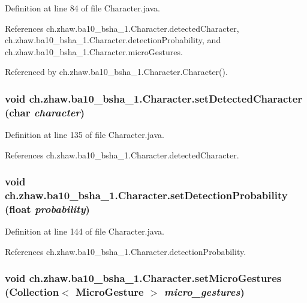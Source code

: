 Definition at line 84 of file Character.java.

References ch.zhaw.ba10\_\-bsha\_\-1.Character.detectedCharacter, ch.zhaw.ba10\_\-bsha\_\-1.Character.detectionProbability, and ch.zhaw.ba10\_\-bsha\_\-1.Character.microGestures.

Referenced by ch.zhaw.ba10\_\-bsha\_\-1.Character.Character().\hypertarget{classch_1_1zhaw_1_1ba10__bsha__1_1_1Character_aa9e5aa7c1059cddf5ff9ff451a36b74e}{
\subsubsection[{setDetectedCharacter}]{\setlength{\rightskip}{0pt plus 5cm}void ch.zhaw.ba10\_\-bsha\_\-1.Character.setDetectedCharacter (char {\em character})}}
\label{classch_1_1zhaw_1_1ba10__bsha__1_1_1Character_aa9e5aa7c1059cddf5ff9ff451a36b74e}


Definition at line 135 of file Character.java.

References ch.zhaw.ba10\_\-bsha\_\-1.Character.detectedCharacter.\hypertarget{classch_1_1zhaw_1_1ba10__bsha__1_1_1Character_a31e123df91176847469ae4ac0fab3066}{
\subsubsection[{setDetectionProbability}]{\setlength{\rightskip}{0pt plus 5cm}void ch.zhaw.ba10\_\-bsha\_\-1.Character.setDetectionProbability (float {\em probability})}}
\label{classch_1_1zhaw_1_1ba10__bsha__1_1_1Character_a31e123df91176847469ae4ac0fab3066}


Definition at line 144 of file Character.java.

References ch.zhaw.ba10\_\-bsha\_\-1.Character.detectionProbability.\hypertarget{classch_1_1zhaw_1_1ba10__bsha__1_1_1Character_ab1a6cfeef0de8bca6e97e79b65320978}{
\subsubsection[{setMicroGestures}]{\setlength{\rightskip}{0pt plus 5cm}void ch.zhaw.ba10\_\-bsha\_\-1.Character.setMicroGestures (Collection$<$ {\bf MicroGesture} $>$ {\em micro\_\-gestures})}}
\label{classch_1_1zhaw_1_1ba10__bsha__1_1_1Character_ab1a6cfeef0de8bca6e97e79b65320978}


